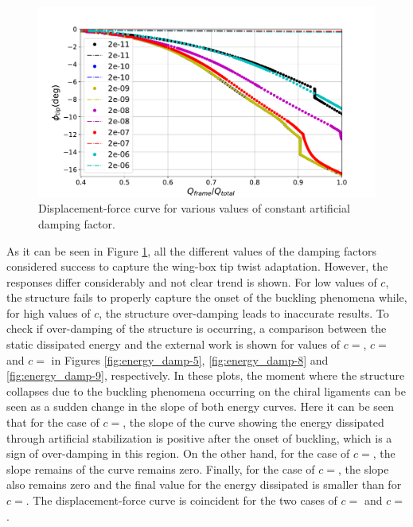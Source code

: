     \begin{figure}[!htpb]
      \centering
      \includegraphics[width=0.8 \textwidth]{figures/result-model/forceDisplacement-damp}
      \caption[Displacement-force curve for various values of constant artificial damping factor]{Displacement-force curve for various values of constant artificial damping factor.}\label{fig:forceDisplacement-damp}
    \end{figure}

    As it can be seen in Figure \ref{fig:forceDisplacement-damp}, all the different values of the damping factors considered success to capture the wing-box tip twist adaptation. However, the responses differ considerably and not clear trend is shown. For low values of $c$, the structure fails to properly capture the onset of the buckling phenomena while, for high values of $c$, the structure over-damping leads to inaccurate results. To check if over-damping of the structure is occurring, a comparison between the static dissipated energy and the external work is shown for values of $c =$, $c =$ and $c =$ in Figures \ref{fig:energy_damp-5}, \ref{fig:energy_damp-8} and \ref{fig:energy_damp-9}, respectively. In these plots, the moment where the structure collapses due to the buckling phenomena occurring on the chiral ligaments can be seen as a sudden change in the slope of both energy curves. Here it can be seen that for the case of $c =$, the slope of the curve showing the energy dissipated through artificial stabilization is positive after the onset of buckling, which is a sign of over-damping in this region. On the other hand, for the case of $c =$, the slope remains of the curve remains zero. Finally, for the case of $c =$, the slope also remains zero and the final value for the energy dissipated is smaller than for $c =$. The displacement-force curve is coincident for the two cases of $c =$ and $c =$.

